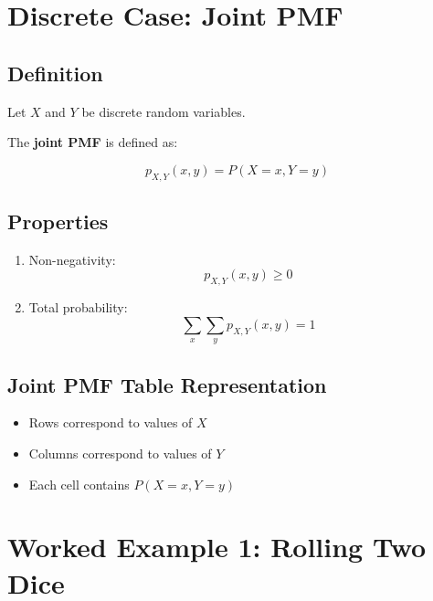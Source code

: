 \documentclass[11pt]{article}
\begin{document}
\vspace{0.5cm}


\section{Discrete Case: Joint PMF}

\subsection{Definition}

Let $X$ and $Y$ be discrete random variables.

The \textbf{joint PMF} is defined as:

\[
p_{X,Y}(x,y) = P(X = x, Y = y)
\]

\vspace{0.3cm}

\subsection{Properties}

\begin{enumerate}
    \item Non-negativity:
    \[
    p_{X,Y}(x,y) \ge 0
    \]
    
    \item Total probability:
    \[
    \sum_x \sum_y p_{X,Y}(x,y) = 1
    \]
\end{enumerate}

\vspace{0.3cm}

\subsection{Joint PMF Table Representation}

\begin{itemize}
    \item Rows correspond to values of $X$
    \item Columns correspond to values of $Y$
    \item Each cell contains $P(X=x, Y=y)$
\end{itemize}

\vspace{0.5cm}


\section{Worked Example 1: Rolling Two Dice}
\end{document}
